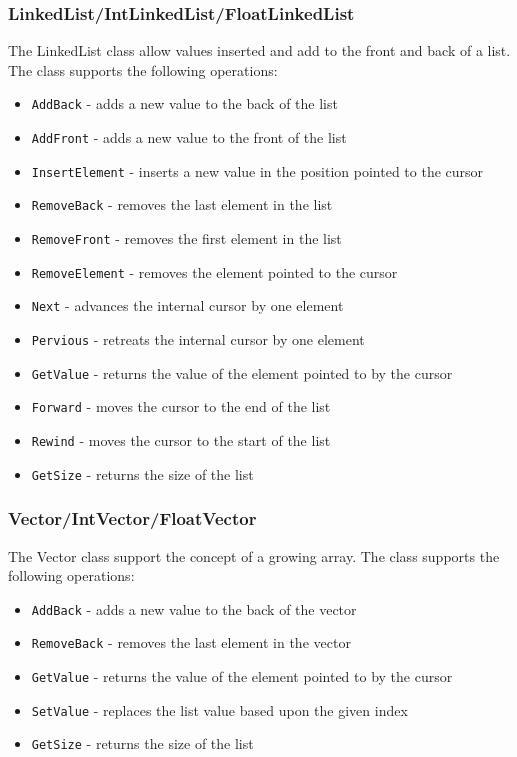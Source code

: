 \documentclass[12pt]{article}
\begin{document}
\subsubsection{LinkedList/IntLinkedList/FloatLinkedList}
The LinkedList class allow values inserted and add to the front and back of a list.  The class supports the following operations:
\begin{itemize}
    \item \texttt{AddBack} - adds a new value to the back of the list
    \item \texttt{AddFront} - adds a new value to the front of the list
    \item \texttt{InsertElement} - inserts a new value in the position pointed to the cursor
    \item \texttt{RemoveBack} - removes the last element in the list
    \item \texttt{RemoveFront} - removes the first element in the list
    \item \texttt{RemoveElement} - removes the element pointed to the cursor
    \item \texttt{Next} - advances the internal cursor by one element
    \item \texttt{Pervious} - retreats the internal cursor by one element
    \item \texttt{GetValue} - returns the value of the element  pointed to by the cursor
    \item \texttt{Forward} - moves the cursor to the end of the list
    \item \texttt{Rewind} - moves the cursor to the start of the list
    \item \texttt{GetSize} - returns the size of the list
\end{itemize}

\subsubsection{Vector/IntVector/FloatVector}
The Vector class support the concept of a growing array.  The class supports the following operations:
\begin{itemize}
    \item \texttt{AddBack} - adds a new value to the back of the vector
    \item \texttt{RemoveBack} - removes the last element in the vector
    \item \texttt{GetValue} - returns the value of the element  pointed to by the cursor
    \item \texttt{SetValue} - replaces the list value based upon the given index
    \item \texttt{GetSize} - returns the size of the list
\end{itemize}
\end{document}
